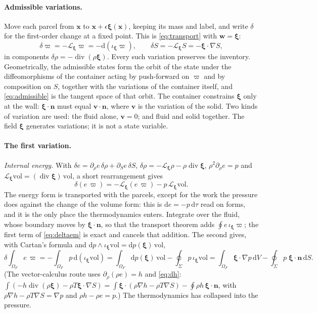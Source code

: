 \documentclass[11pt]{article}
\theoremstyle{definition}
\theoremstyle{remark}
\newcommand{\bv}{\mathbf{v}}
\newcommand{\bw}{\mathbf{w}}
\newcommand{\bn}{\mathbf{n}}
\newcommand{\bx}{\mathbf{x}}
\newcommand{\bxi}{\boldsymbol{\xi}}
\newcommand{\dS}{\,\mathrm{d}S}
\newcommand{\dV}{\,\mathrm{d}V}
\newcommand{\Div}{\operatorname{div}}
\newcommand{\vol}{\mathrm{vol}}
\begin{document}
\paragraph{Admissible variations.} Move each parcel from $\bx$ to $\bx
+ \epsilon\bxi(\bx)$, keeping its mass and label, and write $\delta$
for the first-order change at a fixed point. This is
\eqref{eq:transport} with $\bw = \bxi$:
\begin{equation}
  \delta\varpi = -\mathcal L_{\bxi}\varpi = -\mathrm d(\iota_{\bxi}\varpi),
  \qquad
  \delta S = -\mathcal L_{\bxi}S = -\bxi\cdot\nabla S ,
  \label{eq:admissible}
\end{equation}
in components $\delta\rho = -\Div(\rho\bxi)$. Every such variation
preserves the inventory. Geometrically, the admissible states form the
orbit of the state under the diffeomorphisms of the container acting
by push-forward on $\varpi$ and by composition on $S$, together with
the variations of the container itself, and \eqref{eq:admissible} is
the tangent space of that orbit. The container constrains $\bxi$ only
at the wall: $\bxi\cdot\bn$ must equal $\bv\cdot\bn$, where $\bv$ is
the variation of the solid. Two kinds of variation are used: the fluid
alone, $\bv = 0$; and fluid and solid together. The field $\bxi$
generates variations; it is not a state variable.

\paragraph{The first variation.}
\label{sec:firstvar}
\emph{Internal energy.} With $\delta e = \partial_\rho e\,\delta\rho +
\partial_S e\,\delta S$, $\delta\rho = -\mathcal L_{\bxi}\rho -
\rho\Div\bxi$, $\rho^2\partial_\rho e = p$ and $\mathcal
L_{\bxi}\vol = (\Div\bxi)\,\vol$, a short rearrangement gives
\begin{equation}
  \delta(e\,\varpi) = -\mathcal L_{\bxi}(e\,\varpi) - p\,\mathcal L_{\bxi}\vol .
  \label{eq:deltaem}
\end{equation}
The energy form is transported with the parcels, except for the work
the pressure does against the change of the volume form: this is
$\mathrm de = -p\,\mathrm d\tau$ read on forms, and it is the only
place the thermodynamics enters. Integrate over the fluid, whose
boundary moves by $\bxi\cdot\bn$, so that the transport theorem adds
$\oint e\,\iota_{\bxi}\varpi$; the first term of \eqref{eq:deltaem} is
exact and cancels that addition. The second gives, with Cartan's
formula and $\mathrm dp\wedge\iota_{\bxi}\vol = \mathrm
dp(\bxi)\,\vol$,
\begin{equation}
  \delta\!\int_{\Omega_F}\!e\,\varpi
  = -\int_{\Omega_F}p\,\mathrm d(\iota_{\bxi}\vol)
  = \int_{\Omega_F}\mathrm dp(\bxi)\,\vol - \oint_\Sigma p\,\iota_{\bxi}\vol
  = \int_{\Omega_F}\bxi\cdot\nabla p\dV - \oint_\Sigma p\;\bxi\cdot\bn\dS .
  \label{eq:dEint}
\end{equation}
(The vector-calculus route uses $\partial_\rho(\rho e) = h$ and
\eqref{eq:dh}: $\int(-h\Div(\rho\bxi) - \rho T\bxi\cdot\nabla S) =
\int\bxi\cdot(\rho\nabla h - \rho T\nabla S) - \oint\rho h\,\bxi\cdot
\bn$, with $\rho\nabla h - \rho T\nabla S = \nabla p$ and $\rho h -
\rho e = p$.) The thermodynamics has collapsed into the pressure.
\end{document}
